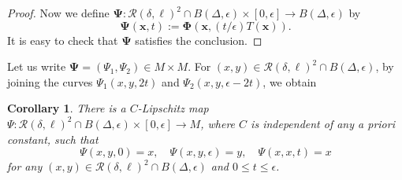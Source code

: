 \documentclass[a4paper,12pt]{amsart}
\theoremstyle{plain}
\newtheorem{cor}[thm]{Corollary}
\theoremstyle{definition}
\numberwithin{thm}{section}
\numberwithin{equation}{section}
\begin{document}
\begin{proof}
Now we define $\mathbf\Psi:\mathcal R(\delta,\ell)^2\cap B(\Delta,\epsilon)\times[0,\epsilon]\to B(\Delta,\epsilon)$ by
\[\mathbf\Psi(\mathbf x,t):=\mathbf\Phi(\mathbf x,(t/\epsilon)T(\mathbf x)).\]
It is easy to check that $\mathbf\Psi$ satisfies the conclusion.
\end{proof}

Let us write $\mathbf\Psi=(\Psi_1,\Psi_2)\in M\times M$.
For $(x,y)\in\mathcal R(\delta,\ell)^2\cap B(\Delta,\epsilon)$, by joining the curves $\Psi_1(x,y,2t)$ and $\Psi_2(x,y,\epsilon-2t)$, we obtain

\begin{cor}\label{cor:diag}
There is a $C$-Lipschitz map $\Psi:\mathcal R(\delta,\ell)^2\cap B(\Delta,\epsilon)\times[0,\epsilon]\to M$, where $C$ is independent of any a priori constant, such that
\[\Psi(x,y,0)=x,\quad\Psi(x,y,\epsilon)=y,\quad\Psi(x,x,t)=x\]
for any $(x,y)\in\mathcal R(\delta,\ell)^2\cap B(\Delta,\epsilon)$ and $0\le t\le\epsilon$.
\end{cor}
\end{document}
